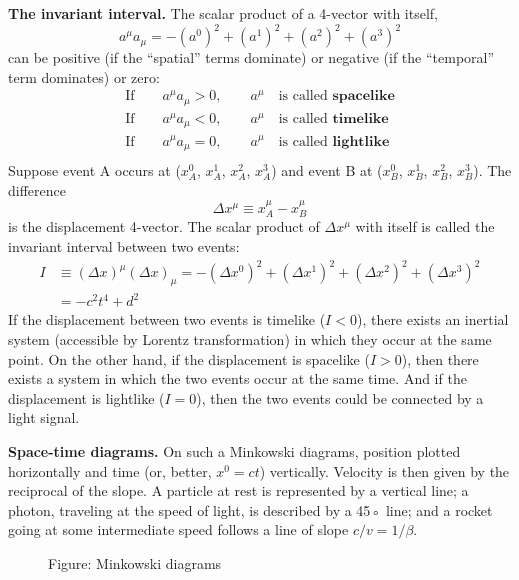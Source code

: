 \documentclass[../../../main.tex]{subfiles}
\begin{document}
\textbf{The invariant interval.} The scalar product of a 4-vector with itself,
\begin{equation*}
    a^\mu a_\mu  = -(a^0)^2 + (a^1)^2 + (a^2)^2 + (a^3)^2 
\end{equation*}
can be positive (if the “spatial” terms dominate) or negative (if the “temporal” term dominates) or zero:
\begin{align*}
    \text{If}\qquad a^\mu a_\mu>0,\qquad a^\mu\quad\text{is called }\textbf{spacelike}\\
    \text{If}\qquad a^\mu a_\mu<0,\qquad a^\mu\quad\text{is called }\textbf{timelike}\\
    \text{If}\qquad a^\mu a_\mu=0,\qquad a^\mu\quad\text{is called }\textbf{lightlike}\\
\end{align*}
Suppose event A occurs at ($x_A^0$, $x_A^1$, $x_A^2$, $x_A^3$) and event B at ($x_B^0$, $x_B^1$, $x_B^2$, $x_B^3$). The difference
\begin{equation*}
    \Delta x^\mu\equiv x_A^\mu-x_B^\mu
\end{equation*}
is the displacement 4-vector. The scalar product of $\Delta x^\mu$ with itself is called the invariant interval between two events:
\begin{align*}
    I&\equiv (\Delta x)^\mu(\Delta x)_\mu= -(\Delta x^0)^2 + (\Delta x^1)^2 + (\Delta x^2)^2 + (\Delta x^3)^2 \\
    &=-c^2t^4+d^2
\end{align*}
If the displacement between two events is timelike ($I < 0$), there exists an inertial system (accessible by Lorentz transformation) in which they occur at the same point. On the other hand, if the displacement is spacelike ($I > 0$), then there exists a system in which the two events occur at the same time. And if the displacement is lightlike ($I = 0$), then the two events could be connected by a light signal.

\textbf{Space-time diagrams.} On such a Minkowski diagrams, position plotted horizontally and time (or, better, $x^0 = ct$) vertically. Velocity is then given by the reciprocal of the slope. A particle at rest is represented by a vertical line; a photon, traveling at the speed of light, is described by a 45◦ line; and a rocket going at some intermediate speed follows a line of slope $c/v = 1/\beta$.
\begin{figure}
    \centering
    \caption*{Figure: Minkowski diagrams}
\end{figure}
\end{document}
